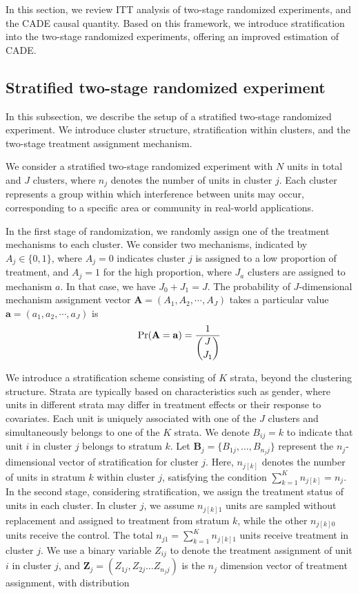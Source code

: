 \documentclass[a4paper, 12pt]{article}
\begin{document}
In this section, we review ITT analysis of two-stage randomized experiments, and the CADE causal quantity. Based on this framework, we introduce stratification into the two-stage randomized experiments, offering an improved estimation of CADE.


\subsection{Stratified two-stage randomized experiment}

In this subsection, we describe the setup of a stratified two-stage randomized experiment. We introduce cluster structure, stratification within clusters, and the two-stage treatment assignment mechanism.

We consider a stratified two-stage randomized experiment with $N$ units in total and $J$ clusters, where $n_j$ denotes the number of units in cluster $j$. Each cluster represents a group within which interference between units may occur, corresponding to a specific area or community in real-world applications. 



In the first stage of randomization, we randomly assign one of the treatment mechanisms to each cluster. We consider two mechanisms, indicated by $A_j \in \{0,1\}$, where $A_j = 0$ indicates cluster $j$ is assigned to a low proportion of treatment, and $A_j = 1$ for the high proportion, where $J_a$ clusters are assigned to mechanism $a$. In that case, we have $J_0 + J_1 = J$. The probability of $J$-dimensional mechanism assignment vector $\mathbf{A} = (A_1, A_2, \cdots, A_J)$ takes a particular value $\mathbf{a} = (a_1, a_2, \cdots, a_J)$ is  
$$\Pr(\mathbf{A} = \mathbf{a}) = \frac{1}{\dbinom{J}{J_1}}$$

We introduce a stratification scheme consisting of $K$ strata, beyond the clustering structure. Strata are typically based on characteristics such as gender, where units in different strata may differ in treatment effects or their response to covariates. Each unit is uniquely associated with one of the $J$ clusters and simultaneously belongs to one of the $K$ strata. We denote $B_{ij} = k$ to indicate that unit $i$ in cluster $j$ belongs to stratum $k$. Let $\mathbf{B}_j = \{B_{1j}, \dots, B_{n_jj}\}$ represent the $n_j$-dimensional vector of stratification for cluster $j$. Here, $n_{j[k]}$ denotes the number of units in stratum $k$ within cluster $j$, satisfying the condition $\sum_{k=1}^K n_{j[k]} = n_j$.
In the second stage, considering stratification, we assign the treatment status of units in each cluster.
In cluster $j$, we assume $n_{j[k]1}$ units are sampled without replacement and assigned to treatment from stratum $k$, while the other $n_{j[k]0}$ units receive the control. The total $n_{j1} = \sum^{K}_{k=1} n_{j[k]1}$ units receive treatment in cluster $j$. We use a binary variable $Z_{ij}$ to denote the treatment assignment of unit $i$ in cluster $j$, and $\mathbf{Z}_j = (Z_{1j}, Z_{2j} \dots Z_{n_jj})$ is the $n_j$ dimension vector of treatment assignment, with distribution 
\end{document}
